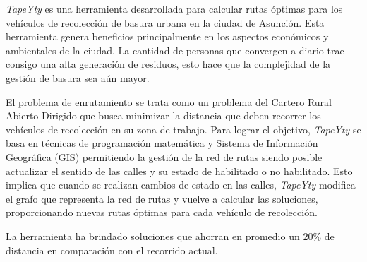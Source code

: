 \begin{resumen}
\textit{TapeYty} es una herramienta desarrollada para calcular rutas óptimas para los vehículos de recolección de basura urbana en la ciudad de Asunción. Esta herramienta genera beneficios principalmente en los aspectos económicos y ambientales de la ciudad. La cantidad de personas que convergen a diario trae consigo una alta generación de residuos, esto hace que la complejidad de la gestión de basura sea aún mayor.

El problema de enrutamiento se trata como un problema del Cartero Rural Abierto Dirigido que busca minimizar la distancia que deben recorrer los vehículos de recolección en su zona de trabajo. Para lograr el objetivo, \textit{TapeYty} se basa en técnicas de programación matemática y Sistema de Información Geográfica (GIS) permitiendo la gestión de la red de rutas siendo posible actualizar el sentido de las calles y su estado de habilitado o no habilitado. Esto implica que cuando se realizan cambios de estado en las calles, \textit{TapeYty} modifica el grafo que representa la red de rutas y vuelve a calcular las soluciones, proporcionando nuevas rutas óptimas para cada vehículo de recolección.

La herramienta ha brindado soluciones que ahorran en promedio un 20\% de distancia en comparación con el recorrido actual.



\end{resumen}